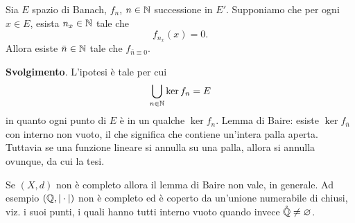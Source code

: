\begin{exercise}
\label{ex:ptwise_eventually_null_seq}
	Sia $E$ spazio di Banach, $f_n$, $n \in \mathbb{N}$ successione in $E'$. Supponiamo che per ogni $x \in E$, esista $n_x \in \mathbb{N}$ tale che
	\begin{equation*}
		f_{n_x}(x) = 0.
	\end{equation*}
	Allora esiste $\bar n \in \mathbb{N}$ tale che $f_{\bar n \equiv 0}$.

	\noindent\textbf{Svolgimento}. L'ipotesi è tale per cui
	\begin{equation*}
		\bigcup_{n \in \mathbb{N}} \ker f_n = E
	\end{equation*}
	in quanto ogni punto di $E$ è in un qualche $\ker f_n$. Lemma di Baire: esiste $\ker f_{\bar n}$ con interno non vuoto, il che significa che contiene un'intera palla aperta.
	Tuttavia se una funzione lineare si annulla su una palla, allora si annulla ovunque, da cui la tesi.
\end{exercise}

\begin{counterexample}
	Se $(X, d)$ non è completo allora il lemma di Baire non vale, in generale. Ad esempio $(\mathbb{Q}, |\cdot|)$ non è completo ed è coperto da un'unione numerabile di chiusi, viz. i suoi punti, i quali hanno tutti interno vuoto quando invece $\mathring{\mathbb{Q}} \neq \varnothing$.
\end{counterexample}

